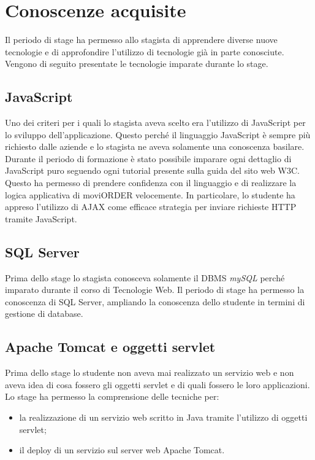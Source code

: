 \section{Conoscenze acquisite}

Il periodo di stage ha permesso allo stagista di apprendere diverse nuove tecnologie e di approfondire l'utilizzo di tecnologie già in parte conosciute. Vengono di seguito presentate le tecnologie imparate durante lo stage.

\subsection{JavaScript}

Uno dei criteri per i quali lo stagista aveva scelto \visione{} era l'utilizzo di JavaScript per lo sviluppo dell'applicazione. Questo perché il linguaggio JavaScript è sempre più richiesto dalle aziende e lo stagista ne aveva solamente una conoscenza basilare. Durante il periodo di formazione è stato possibile imparare ogni dettaglio di JavaScript puro seguendo ogni tutorial presente sulla guida del sito web W3C. Questo ha permesso di prendere confidenza con il linguaggio e di realizzare la logica applicativa di moviORDER velocemente. In particolare, lo studente ha appreso l'utilizzo di AJAX come efficace strategia per inviare richieste HTTP tramite JavaScript.

\subsection{SQL Server}

Prima dello stage lo stagista conosceva solamente il DBMS \textit{mySQL} perché imparato durante il corso di Tecnologie Web. Il periodo di stage ha permesso la conoscenza di SQL Server, ampliando la conoscenza dello studente in termini di gestione di database.

\subsection{Apache Tomcat e oggetti servlet}

Prima dello stage lo studente non aveva mai realizzato un servizio web e non aveva idea di cosa fossero gli oggetti servlet e di quali fossero le loro applicazioni. Lo stage ha permesso la comprensione delle tecniche per:
\begin{itemize}
	\item la realizzazione di un servizio web scritto in Java tramite l'utilizzo di oggetti servlet;
	\item il deploy di un servizio sul server web Apache Tomcat.
\end{itemize}

